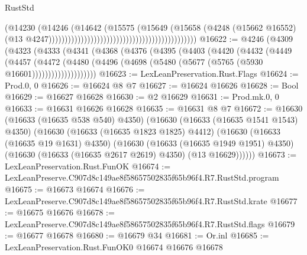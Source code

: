 \begin{lexlean}{RustStd}
\begin{coremodule}
                                                                                (@14230
                                                                                  (@14246
                                                                                    (@14642
                                                                                      (@15575
                                                                                        (@15649
                                                                                          (@15658
                                                                                            (@4248
                                                                                              (@15662
                                                                                                @16552)
                                                                                              (@13
                                                                                                @4247))))))))))))))))))))))))))))))))))))))))))))))
@16622 := @4246
    (@4309
      (@4323
        (@4333
          (@4341
            (@4368
              (@4376
                (@4395
                  (@4403
                    (@4420
                      (@4432
                        (@4449
                          (@4457
                            (@4472
                              (@4480
                                (@4496 (@4698 (@5480 (@5677 (@5765 (@5930 @16601))))))))))))))))))))
@16623 := LexLeanPreservation.Rust.Flags
@16624 := Prod.{0, 0}
@16626 := @16624 @8 @7
@16627 := @16624 @16626
@16628 := Bool
@16629 := @16627 @16628
@16630 := @2 @16629
@16631 := Prod.mk.{0, 0}
@16633 := @16631 @16626 @16628
@16635 := @16631 @8 @7
@16672 := @16630
    (@16633 (@16635 @538 @540) @4350)
    (@16630
      (@16633 (@16635 @1541 @1543) @4350)
      (@16630
        (@16633 (@16635 @1823 @1825) @4412)
        (@16630
          (@16633 (@16635 @19 @1631) @4350)
          (@16630
            (@16633 (@16635 @1949 @1951) @4350)
            (@16630 (@16633 (@16635 @2617 @2619) @4350) (@13 @16629))))))
@16673 := LexLeanPreservation.Rust.FunOK
@16674 := LexLeanPreserve.C907d8c149ae8f58657502835f65b96f4.R7.RustStd.program
@16675 := @16673 @16674
@16676 := LexLeanPreserve.C907d8c149ae8f58657502835f65b96f4.R7.RustStd.krate
@16677 := @16675 @16676
@16678 := LexLeanPreserve.C907d8c149ae8f58657502835f65b96f4.R7.RustStd.flags
@16679 := @16677 @16678
@16680 := @16679 @34
@16681 := Or.inl
@16685 := LexLeanPreservation.Rust.FunOK0 @16674 @16676 @16678

\end{coremodule}
\end{lexlean}
